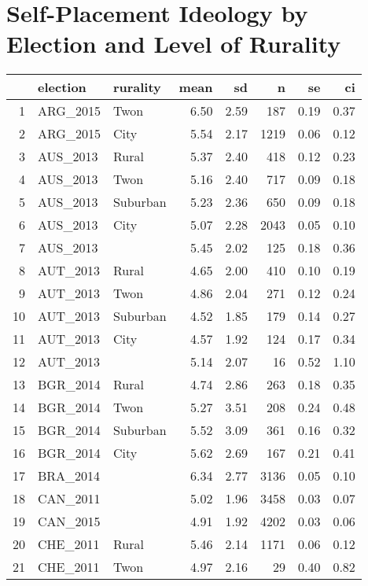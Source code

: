 \documentclass[12pt, titlepage]{article}
\begin{document}
\section{Self-Placement Ideology by Election and Level of Rurality}

\begin{table}[ht]
	\centering
	\begin{tabular}{rllrrrrr}
		\hline
		& election & rurality & mean & sd & n & se & ci \\ 
		\hline
		1 & ARG\_2015 & Twon & 6.50 & 2.59 & 187 & 0.19 & 0.37 \\ 
		2 & ARG\_2015 & City & 5.54 & 2.17 & 1219 & 0.06 & 0.12 \\ 
		3 & AUS\_2013 & Rural & 5.37 & 2.40 & 418 & 0.12 & 0.23 \\ 
		4 & AUS\_2013 & Twon & 5.16 & 2.40 & 717 & 0.09 & 0.18 \\ 
		5 & AUS\_2013 & Suburban & 5.23 & 2.36 & 650 & 0.09 & 0.18 \\ 
		6 & AUS\_2013 & City & 5.07 & 2.28 & 2043 & 0.05 & 0.10 \\ 
		7 & AUS\_2013 &  & 5.45 & 2.02 & 125 & 0.18 & 0.36 \\ 
		8 & AUT\_2013 & Rural & 4.65 & 2.00 & 410 & 0.10 & 0.19 \\ 
		9 & AUT\_2013 & Twon & 4.86 & 2.04 & 271 & 0.12 & 0.24 \\ 
		10 & AUT\_2013 & Suburban & 4.52 & 1.85 & 179 & 0.14 & 0.27 \\ 
		11 & AUT\_2013 & City & 4.57 & 1.92 & 124 & 0.17 & 0.34 \\ 
		12 & AUT\_2013 &  & 5.14 & 2.07 &  16 & 0.52 & 1.10 \\ 
		13 & BGR\_2014 & Rural & 4.74 & 2.86 & 263 & 0.18 & 0.35 \\ 
		14 & BGR\_2014 & Twon & 5.27 & 3.51 & 208 & 0.24 & 0.48 \\ 
		15 & BGR\_2014 & Suburban & 5.52 & 3.09 & 361 & 0.16 & 0.32 \\ 
		16 & BGR\_2014 & City & 5.62 & 2.69 & 167 & 0.21 & 0.41 \\ 
		17 & BRA\_2014 &  & 6.34 & 2.77 & 3136 & 0.05 & 0.10 \\ 
		18 & CAN\_2011 &  & 5.02 & 1.96 & 3458 & 0.03 & 0.07 \\ 
		19 & CAN\_2015 &  & 4.91 & 1.92 & 4202 & 0.03 & 0.06 \\ 
		20 & CHE\_2011 & Rural & 5.46 & 2.14 & 1171 & 0.06 & 0.12 \\ 
		21 & CHE\_2011 & Twon & 4.97 & 2.16 &  29 & 0.40 & 0.82 \\ 

\end{tabular}
\end{table}
\end{document}
